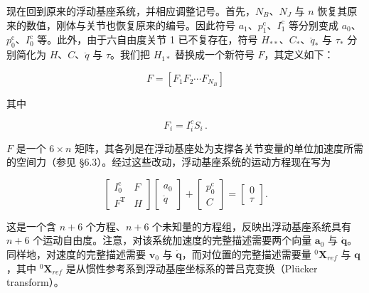 \documentclass[10pt,a4paper]{book}
\theoremstyle{thmstyle} %
\theoremstyle{defstyle} %
\theoremstyle{prostyle} %
\begin{document}
现在回到原来的浮动基座系统，并相应调整记号。首先，$N_{B}$、$N_{J}$ 与 $n$ 恢复其原来的数值，刚体与关节也恢复原来的编号。因此符号 $a_{1}$、$p_{1}^{\mathrm{c}}$、$I_{1}^{\mathrm{c}}$ 等分别变成 $a_{0}$、$p_{0}^{\mathrm{c}}$、$I_{0}^{\mathrm{c}}$ 等。此外，由于六自由度关节 1 已不复存在，符号 $H_{**}$、$C_{*}$、$\ddot{q}_{*}$ 与 $\tau_{*}$ 分别简化为 $H$、$C$、$\ddot{q}$ 与 $\tau$。我们把 $H_{1*}$ 替换成一个新符号 $F$，其定义如下：



$$
F = \left[ F _ { 1 }  F _ { 2 }  \cdots  F _ { N _ { B } } \right]
$$



其中



$$
F _ { i } = I _ { i } ^{c} S _ { i } \, .
$$



$F$ 是一个 $6 \times n$ 矩阵，其各列是在浮动基座处为支撑各关节变量的单位加速度所需的空间力（参见 §6.3）。经过这些改动，浮动基座系统的运动方程现在写为



$$
\left[ \begin{array}{ll} { { I _ { 0 } ^{\mathrm { c} } } } & { { F } } \\{ { F ^{\mathrm { T} } } } & { { H } } \end{array} \right] \left[ \begin{array}{l} { { a _ { 0 } } } \\{ { \ddot { q } } } \end{array} \right] + \left[ \begin{array}{l} { { p _ { 0 } ^{\mathrm { c} } } } \\{ { C } } \end{array} \right] = \left[ \begin{array}{l} { { 0 } } \\{ { \tau } } \end{array} \right] .
$$



这是一个含 $n+6$ 个方程、$n+6$ 个未知量的方程组，反映出浮动基座系统具有 $n+6$ 个运动自由度。注意，对该系统加速度的完整描述需要两个向量 $\boldsymbol{a}_0$ 与 $\dot{\boldsymbol{q}}$。同样地，对速度的完整描述需要 $\boldsymbol{v}_0$ 与 $\dot{\boldsymbol{q}}$，而对位置的完整描述需要量 ${}^0\boldsymbol{X}_{ref}$ 与 $\boldsymbol{q}$，其中 ${}^0\boldsymbol{X}_{ref}$ 是从惯性参考系到浮动基座坐标系的普吕克变换（Plücker transform）。
\end{document}
